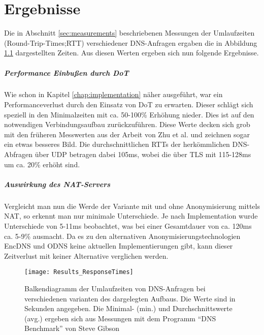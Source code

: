\chapter{Ergebnisse}
\label{chap:results}

Die in Abschnitt \ref{sec:measurements} beschriebenen Messungen der Umlaufzeiten (Round-Trip-Times;RTT) verschiedener DNS-Anfragen ergaben die in Abbildung \ref{img:results-times} dargestellten Zeiten. Aus diesen Werten ergeben sich nun folgende Ergebnisse.

\paragraph{Performance Einbußen durch DoT}
Wie schon in Kapitel \ref{chap:implementation} näher ausgeführt, war ein Performanceverlust durch den Einsatz von DoT zu erwarten. Dieser schlägt sich speziell in den Minimalzeiten mit ca. 50-100\% Erhöhung nieder. Dies ist auf den notwendigen Verbindungsaufbau zurückzuführen. Diese Werte decken sich grob mit den früheren Messwerten aus der Arbeit von Zhu et al.\cite{Zhu2015} und zeichnen sogar ein etwas besseres Bild. Die durchschnittlichen RTTs der herkömmlichen DNS-Abfragen über UDP betragen dabei 105ms, wobei die über TLS mit 115-128ms um ca. 20\% erhöht sind.

\paragraph{Auswirkung des NAT-Servers}
Vergleicht man nun die Werde der Variante mit und ohne Anonymisierung mittels NAT, so erkennt man nur minimale Unterschiede. Je nach Implementation wurde Unterschiede von 5-11ms beobachtet, was bei einer Gesamtdauer von ca. 120ms ca. 5-9\% ausmacht. Da es zu den alternativen Anonymisierungstechnologien EncDNS und ODNS keine aktuellen Implementierungen gibt, kann dieser Zeitverlust mit keiner Alternative verglichen werden.

\begin{figure}[hb]
    \centering
    \texttt{[image: Results\_ResponseTimes]}
    \caption{Balkendiagramm der Umlaufzeiten von DNS-Anfragen bei verschiedenen varianten des dargelegten Aufbaus. Die Werte sind in Sekunden angegeben. Die Minimal- (min.) und Durchschnittswerte (avg.) ergeben sich aus Messungen mit dem Programm ``DNS Benchmark'' von Steve Gibson}
    \label{img:results-times}
\end{figure}